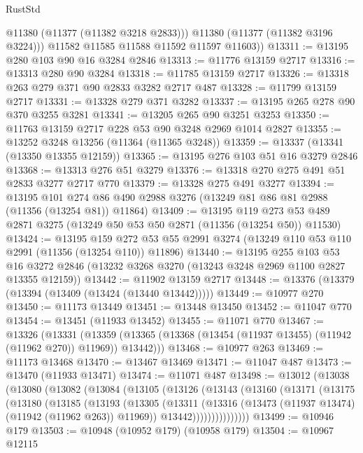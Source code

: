 \begin{lexlean}{RustStd}
\begin{coremodule}
            @11380
            (@11377 (@11382 @3218 @2833)))
          @11380
          (@11377 (@11382 @3196 @3224)))
        @11582
        @11585
        @11588
        @11592
        @11597
        @11603))
@13311 := @13195 @280 @103 @90 @16 @3284 @2846
@13313 := @11776 @13159 @2717
@13316 := @13313 @280 @90 @3284
@13318 := @11785 @13159 @2717
@13326 := @13318 @263 @279 @371 @90 @2833 @3282 @2717 @487
@13328 := @11799 @13159 @2717
@13331 := @13328 @279 @371 @3282
@13337 := @13195 @265 @278 @90 @370 @3255 @3281
@13341 := @13205 @265 @90 @3251 @3253
@13350 := @11763 @13159 @2717 @228 @53 @90 @3248 @2969 @1014 @2827
@13355 := @13252 @3248 @13256 (@11364 (@11365 @3248))
@13359 := @13337 (@13341 (@13350 @13355 @12159))
@13365 := @13195 @276 @103 @51 @16 @3279 @2846
@13368 := @13313 @276 @51 @3279
@13376 := @13318 @270 @275 @491 @51 @2833 @3277 @2717 @770
@13379 := @13328 @275 @491 @3277
@13394 := @13195
    @101
    @274
    @86
    @490
    @2988
    @3276
    (@13249 @81 @86 @81 @2988 (@11356 (@13254 @81)) @11864)
@13409 := @13195
    @119
    @273
    @53
    @489
    @2871
    @3275
    (@13249 @50 @53 @50 @2871 (@11356 (@13254 @50)) @11530)
@13424 := @13195
    @159
    @272
    @53
    @55
    @2991
    @3274
    (@13249 @110 @53 @110 @2991 (@11356 (@13254 @110)) @11896)
@13440 := @13195
    @255
    @103
    @53
    @16
    @3272
    @2846
    (@13232 @3268 @3270 (@13243 @3248 @2969 @1100 @2827 @13355 @12159))
@13442 := @11902 @13159 @2717
@13448 := @13376 (@13379 (@13394 (@13409 (@13424 (@13440 @13442)))))
@13449 := @10977 @270
@13450 := @11173 @13449
@13451 := @13448 @13450
@13452 := @11047 @770
@13454 := @13451 (@11933 @13452)
@13455 := @11071 @770
@13467 := @13326
    (@13331
      (@13359 (@13365 (@13368 (@13454 (@11937 @13455) (@11942 (@11962 @270)) @11969)) @13442)))
@13468 := @10977 @263
@13469 := @11173 @13468
@13470 := @13467 @13469
@13471 := @11047 @487
@13473 := @13470 (@11933 @13471)
@13474 := @11071 @487
@13498 := @13012
    (@13038
      (@13080
        (@13082
          (@13084
            (@13105
              (@13126
                (@13143
                  (@13160
                    (@13171
                      (@13175
                        (@13180
                          (@13185
                            (@13193
                              (@13305
                                (@13311
                                  (@13316 (@13473 (@11937 @13474) (@11942 (@11962 @263)) @11969))
                                  @13442)))))))))))))))
@13499 := @10946 @179
@13503 := @10948 (@10952 @179) (@10958 @179)
@13504 := @10967 @12115

\end{coremodule}
\end{lexlean}
